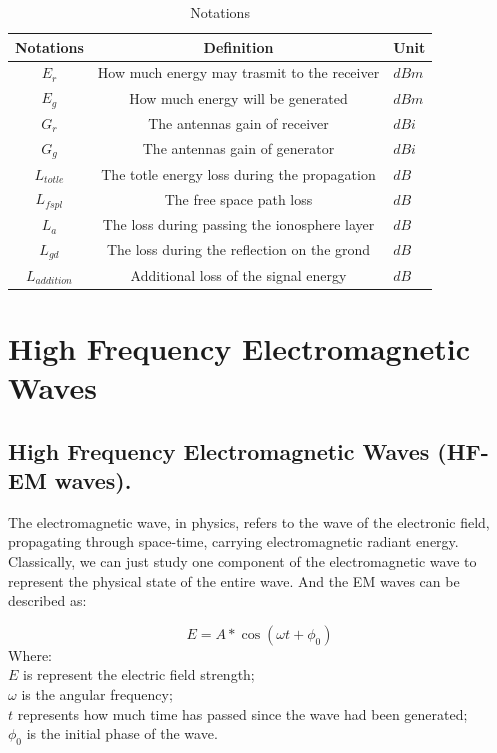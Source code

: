 \documentclass{mcmthesis}
\begin{document}
    \begin{table}[h]
      \centering
        \begin{tabular}{|c|c|l|}

          \hline Notations & Definition & Unit \\
          \hline $E_{r}$ & How much energy may trasmit to the receiver & $dBm$ \\
          \hline $E_{g}$ & How much energy will be generated & $dBm$ \\
          \hline $G_{r}$ & The antennas gain of receiver & $dBi$ \\
          \hline $G_{g}$ & The antennas gain of generator & $dBi$ \\
          \hline $L_{totle}$ & The totle energy loss during the propagation & $dB$ \\
          \hline $L_{fspl}$ & The free space path loss & $dB$ \\
          \hline $L_{a}$ & The loss during passing the ionosphere layer & $dB$ \\
          \hline $L_{gd}$ & The loss during the reflection on the grond & $dB$ \\
          \hline $L_{addition}$ & Additional loss of the signal energy & $dB$ \\
          \hline

        \end{tabular}
        \caption{Notations}
    		\label{tab:Notations}
    \end{table}



\section{High Frequency Electromagnetic Waves}
  \subsection{High Frequency Electromagnetic Waves (HF-EM waves).}

    The electromagnetic wave, in physics, refers to the wave of the electronic field, propagating through space-time, carrying electromagnetic radiant energy. Classically, we can just study one component of the electromagnetic wave to represent the physical state of the entire wave. And the EM waves can be described as:

      \begin{equation}\label{eq:EMW}
        E = A * \cos(\omega t + \phi_{0})
      \end{equation}
      Where: \\
      $E$ is represent the electric field strength; \\
      $\omega$ is the angular frequency;\\
      $t$ represents how much time has passed since the wave had been generated;\\
      $\phi_{0}$ is the initial phase of the wave.\\
\end{document}
